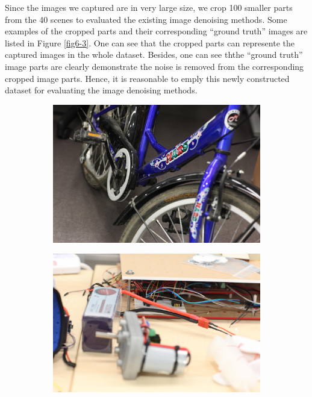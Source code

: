 Since the images we captured are in very large size, we crop 100 smaller parts from the 40 scenes to evaluated the existing image denoising methods. Some examples of the cropped parts and their corresponding ``ground truth'' images are listed in Figure \ref{fig6-3}. One can see that the cropped parts can represente the captured images in the whole dataset. Besides, one can see ththe ``ground truth'' image parts are clearly demonstrate the noise is removed from the corresponding cropped image parts. Hence, it is reasonable to emply this newly constructed dataset for evaluating the image denoising methods.


\begin{figure}
    \centering
    \begin{subfigure}[t]{0.4\textwidth}
        \centering
        \includegraphics[width=1\textwidth]{images/dataset/Canon5D2_5_160_6400_bicycle_mean.JPG}
    \end{subfigure}
    \hfill
    \begin{subfigure}[t]{0.4\textwidth}
        \centering
        \includegraphics[width=1\textwidth]{images/dataset/Canon5D2_5_160_6400_circuit_mean.JPG}

\end{subfigure}
\end{figure}
